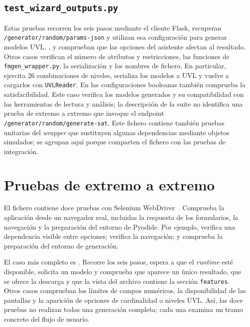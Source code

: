 \subsection{\texttt{test\_wizard\_outputs.py}}

Estas pruebas recorren los seis pasos mediante el cliente Flask, recuperan
\texttt{/generator/random/params-json} y utilizan esa configuración para
generar modelos UVL. ,
y  comprueban que
las opciones del asistente afectan al resultado. Otros casos verifican el
número de atributos y restricciones, las funciones de \texttt{fmgen\_wrapper.py},
la serialización y los nombres de fichero. En particular,
ejercita 26 combinaciones de niveles, serializa los modelos a UVL y vuelve a
cargarlos con \texttt{UVLReader}. En las configuraciones booleanas también
comprueba la satisfacibilidad. Este caso verifica los modelos generados y su
compatibilidad con las herramientas de lectura y análisis; la descripción de
la suite no identifica una prueba de extremo a extremo que invoque el endpoint
\texttt{/generator/random/generate-sat}. Este fichero contiene también pruebas
unitarias del \textit{wrapper} que sustituyen algunas dependencias mediante
objetos simulados; se agrupan aquí porque comparten el fichero con las pruebas
de integración.

\section{Pruebas de extremo a extremo}
\label{sec:pruebas_e2e}


El fichero  contiene doce pruebas con Selenium
WebDriver~\cite{selenium}. Comprueba la aplicación desde un navegador real,
incluidas la respuesta de los formularios, la navegación y la preparación del
entorno de Pyodide. Por ejemplo,
verifica una dependencia visible entre opciones;
verifica la navegación; y
 comprueba la
preparación del entorno de generación.

El caso más completo es
. Recorre
los seis pasos, espera a que el \textit{runtime} esté disponible, solicita un
modelo y comprueba que aparece un único resultado, que se ofrece la descarga y
que la vista del archivo contiene la sección \texttt{features}. Otros casos
comprueban los límites de campos numéricos, la disponibilidad de las pantallas
y la aparición de opciones de cardinalidad o niveles UVL. Así, las doce
pruebas no realizan todas una generación completa; cada una examina un tramo
concreto del flujo de usuario.

